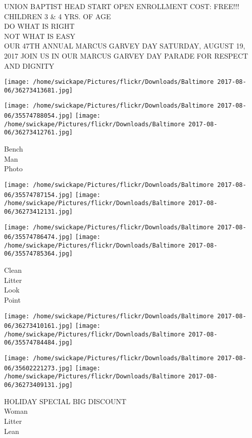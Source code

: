 \documentclass[10pt,letterpaper]{article}
\begin{document}
UNION BAPTIST HEAD START OPEN ENROLLMENT COST: FREE!!! CHILDREN 3 \& 4 YRS. OF AGE\\
DO WHAT IS RIGHT\\
NOT WHAT IS EASY\\
OUR 47TH ANNUAL MARCUS GARVEY DAY SATURDAY, AUGUST 19, 2017 JOIN US IN OUR MARCUS GARVEY DAY PARADE FOR RESPECT AND DIGNITY\\
\pagebreak

\texttt{[image: /home/swickape/Pictures/flickr/Downloads/Baltimore 2017-08-06/36273413681.jpg]}

\vspace{0.25in}
\texttt{[image: /home/swickape/Pictures/flickr/Downloads/Baltimore 2017-08-06/35574788054.jpg]}
\texttt{[image: /home/swickape/Pictures/flickr/Downloads/Baltimore 2017-08-06/36273412761.jpg]}

Bench\\
Man\\
Photo\\
\pagebreak

\texttt{[image: /home/swickape/Pictures/flickr/Downloads/Baltimore 2017-08-06/35574787154.jpg]}
\texttt{[image: /home/swickape/Pictures/flickr/Downloads/Baltimore 2017-08-06/36273412131.jpg]}

\texttt{[image: /home/swickape/Pictures/flickr/Downloads/Baltimore 2017-08-06/35574786474.jpg]}
\texttt{[image: /home/swickape/Pictures/flickr/Downloads/Baltimore 2017-08-06/35574785364.jpg]}

Clean\\
Litter\\
Look\\
Point\\
\pagebreak

\texttt{[image: /home/swickape/Pictures/flickr/Downloads/Baltimore 2017-08-06/36273410161.jpg]}
\texttt{[image: /home/swickape/Pictures/flickr/Downloads/Baltimore 2017-08-06/35574784484.jpg]}

\texttt{[image: /home/swickape/Pictures/flickr/Downloads/Baltimore 2017-08-06/35602221273.jpg]}
\texttt{[image: /home/swickape/Pictures/flickr/Downloads/Baltimore 2017-08-06/36273409131.jpg]}

HOLIDAY SPECIAL BIG DISCOUNT\\
Woman\\
Litter\\
Lean\\
\pagebreak
\end{document}
